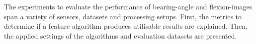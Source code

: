 The experiments to evaluate the performance of \gls{bearing-angle} and \glspl{flexion-image} span a variety of sensors, datasets and processing setups.
First, the metrics to determine if a feature algorithm produces utilisable results are explained.
Then, the applied settings of the algorithms and evaluation datasets are presented.
